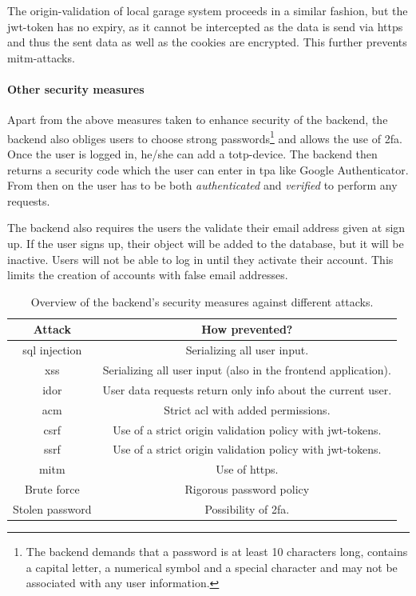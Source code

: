 \ind The origin-validation of local garage system proceeds in a similar fashion, but the \ac{jwt}-token has no expiry, as it cannot be intercepted as the data is send via \ac{https} and thus the sent data as well as the cookies are encrypted. This further prevents \ac{mitm}-attacks.

\paragraph{Other security measures}
Apart from the above measures taken to enhance security of the backend, the backend also obliges users to choose strong passwords\footnote{The backend demands that a password is at least 10 characters long, contains a capital letter, a numerical symbol and a special character and may not be associated with any user information.} and allows the use of \ac{2fa}. Once the user is logged in, he/she can add a \ac{totp}-device. The backend then returns a security code which the user can enter in \ac{tpa} like Google Authenticator. From then on the user has to be both \textit{authenticated} and \textit{verified} to perform any requests. 

\ind The backend also requires the users the validate their email address given at sign up. If the user signs up, their object will be added to the database, but it will be inactive. Users will not be able to log in until they activate their account. This limits the creation of accounts with false email addresses.


\begin{table}[htp]
    \centering
    \begin{tabular}{|c|c|}
         \hline
         \textbf{Attack}& \textbf{How prevented?}  \\
         \hline
         \hline
         \ac{sql} injection & Serializing all user input. \\
         \hline
         \ac{xss} & Serializing all user input (also in the frontend application).\\
         \hline
         \ac{idor} & User data requests return only info about the current user. \\
         \hline
         \ac{acm} & Strict \ac{acl} with added permissions. \\
         \hline
         \ac{csrf} & Use of a strict origin validation policy with \ac{jwt}-tokens. \\
         \hline
         \ac{ssrf} & Use of a strict origin validation policy with \ac{jwt}-tokens. \\
         \hline
         \ac{mitm} & Use of \ac{https}. \\
         \hline
         Brute force & Rigorous password policy \\
         \hline
         Stolen password & Possibility of \ac{2fa}. \\ 
         \hline
    \end{tabular}
    \caption{Overview of the backend's security measures against different attacks.}
    \label{tab:backend-security}
\end{table}


